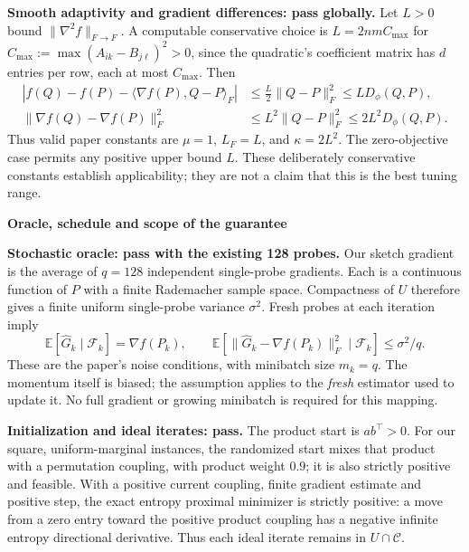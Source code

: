 \documentclass[11pt,a4paper]{article}
\begin{document}
\textbf{Smooth adaptivity and gradient differences: pass globally.}
Let $L>0$ bound $\|\nabla^2 f\|_{F\to F}$. A computable conservative choice is $L=2nmC_{\max}$ for $C_{\max}:=\max(A_{ik}-B_{j\ell})^2>0$, since the quadratic's coefficient matrix has $d$ entries per row, each at most $C_{\max}$. Then
\begin{align*}
 |f(Q)-f(P)-\langle\nabla f(P),Q-P\rangle_F|
 &\leq\tfrac L2\|Q-P\|_F^2\leq L D_\phi(Q,P),\\
 \|\nabla f(Q)-\nabla f(P)\|_F^2
 &\leq L^2\|Q-P\|_F^2\leq2L^2D_\phi(Q,P).
\end{align*}
Thus valid paper constants are $\mu=1$, $L_F=L$, and $\kappa=2L^2$. The zero-objective case permits any positive upper bound $L$. These deliberately conservative constants establish applicability; they are not a claim that this is the best tuning range.

\newpage
{\color{ink}\fontsize{16}{19}\selectfont\bfseries Oracle, schedule and scope of the guarantee\par}
\vspace{3pt}
\textbf{Stochastic oracle: pass with the existing 128 probes.}
Our sketch gradient is the average of $q=128$ independent single-probe gradients. Each is a continuous function of $P$ with a finite Rademacher sample space. Compactness of $U$ therefore gives a finite uniform single-probe variance $\sigma^2$. Fresh probes at each iteration imply
\[
 \mathbb E[\widehat G_k\mid\mathcal F_k]=\nabla f(P_k),\qquad
 \mathbb E[\|\widehat G_k-\nabla f(P_k)\|_F^2\mid\mathcal F_k]\leq\sigma^2/q.
\]
These are the paper's noise conditions, with minibatch size $m_k=q$. The momentum itself is biased; the assumption applies to the \emph{fresh} estimator used to update it. No full gradient or growing minibatch is required for this mapping.

\textbf{Initialization and ideal iterates: pass.}
The product start is $ab^\top>0$. For our square, uniform-marginal instances, the randomized start mixes that product with a permutation coupling, with product weight $0.9$; it is also strictly positive and feasible. With a positive current coupling, finite gradient estimate and positive step, the exact entropy proximal minimizer is strictly positive: a move from a zero entry toward the positive product coupling has a negative infinite entropy directional derivative. Thus each ideal iterate remains in $U\cap\mathcal C$.
\end{document}
